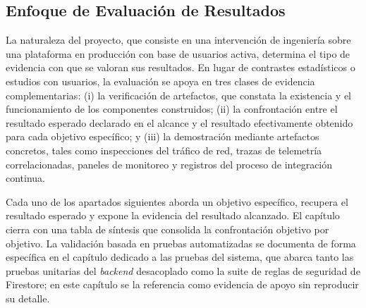 \subsection{Enfoque de Evaluación de Resultados}\label{subsec:enfoque-resultados}

La naturaleza del proyecto, que consiste en una intervención de ingeniería sobre una plataforma en producción con base de usuarios activa, determina el tipo de evidencia con que se valoran sus resultados. En lugar de contrastes estadísticos o estudios con usuarios, la evaluación se apoya en tres clases de evidencia complementarias: (i) la verificación de artefactos, que constata la existencia y el funcionamiento de los componentes construidos; (ii) la confrontación entre el resultado esperado declarado en el alcance y el resultado efectivamente obtenido para cada objetivo específico; y (iii) la demostración mediante artefactos concretos, tales como inspecciones del tráfico de red, trazas de telemetría correlacionadas, paneles de monitoreo y registros del proceso de integración continua.

Cada uno de los apartados siguientes aborda un objetivo específico, recupera el resultado esperado y expone la evidencia del resultado alcanzado. El capítulo cierra con una tabla de síntesis que consolida la confrontación objetivo por objetivo. La validación basada en pruebas automatizadas se documenta de forma específica en el capítulo dedicado a las pruebas del sistema, que abarca tanto las pruebas unitarias del \textit{backend} desacoplado como la suite de reglas de seguridad de Firestore; en este capítulo se la referencia como evidencia de apoyo sin reproducir su detalle.
